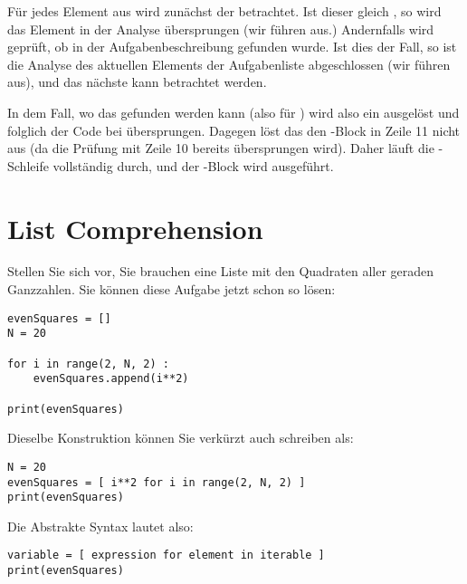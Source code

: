 Für jedes Element aus  wird zunächst der  betrachtet. Ist dieser gleich , so wird das Element in der Analyse übersprungen (wir führen  aus.) Andernfalls wird geprüft, ob  in der Aufgabenbeschreibung  gefunden wurde. Ist dies der Fall, so ist die Analyse des aktuellen Elements der Aufgabenliste  abgeschlossen (wir führen  aus), und das nächste  kann betrachtet werden.

In dem Fall, wo das  gefunden werden kann (also \eg für ) wird also ein  ausgelöst und folglich der Code bei  übersprungen. Dagegen löst das  den -Block in Zeile 11 nicht aus (da die Prüfung mit Zeile 10 bereits übersprungen wird). Daher läuft die -Schleife vollständig durch, und der -Block wird ausgeführt.

\section{List Comprehension}
Stellen Sie sich vor, Sie brauchen eine Liste mit den Quadraten aller geraden Ganzzahlen. Sie können diese Aufgabe jetzt schon so lösen:

\begin{codebox}
\begin{verbatim}
evenSquares = []
N = 20

for i in range(2, N, 2) :
    evenSquares.append(i**2)

print(evenSquares)
\end{verbatim}
\end{codebox}

\begin{cmdbox}
\end{cmdbox}

Dieselbe Konstruktion können Sie verkürzt auch schreiben als:
\begin{codebox}
\begin{verbatim}
N = 20
evenSquares = [ i**2 for i in range(2, N, 2) ]
print(evenSquares)
\end{verbatim}
\end{codebox}

Die Abstrakte Syntax lautet also:
\begin{codebox}
\begin{verbatim}
variable = [ expression for element in iterable ]
print(evenSquares)
\end{verbatim}
\end{codebox}


